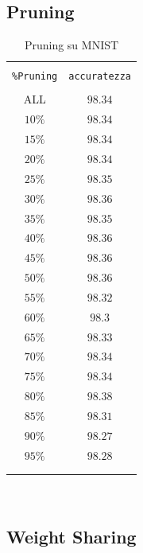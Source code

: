 \documentclass[11pt,a4paper,twoside,
openright]{book}
\begin{document}
\subsection{Pruning}

\vspace*{\fill}
\begin{center}

\begin{table}[]
  \small
  \caption{Pruning su MNIST}\label{tab:tabws}
\begin{center}
\begin{tabular}{cc}

\hline\\[-11pt]

\hline\\[-11pt]
\texttt{\%Pruning} & \texttt{accuratezza} \\[1pt]
\hline\\[-6.5pt]
ALL & $98.34$ \\ 
$10\%$ & $98.34$ \\ 
$15\%$ & $98.34$ \\ 
$20\%$ & $98.34$ \\ 
$25\%$ & $98.35$ \\ 
$30\%$ & $98.36$ \\ 
$35\%$ & $98.35$ \\ 
$40\%$ & $98.36$ \\ 
$45\%$ & $98.36$ \\ 
$50\%$ & $98.36$ \\ 
$55\%$ & $98.32$ \\ 
$60\%$ & $98.3$ \\ 
$65\%$ & $98.33$ \\ 
$70\%$ & $98.34$ \\ 
$75\%$ & $98.34$ \\ 
$80\%$ & $98.38$ \\ 
$85\%$ & $98.31$ \\ 
$90\%$ & $98.27$ \\ 
$95\%$ & $98.28$ \\   
\hline\\[-11pt]
\hline\\[-8pt]
\end{tabular}\\[5pt]
\end{center}
\normalsize
\end{table}
\end{center}



\subsection{Weight Sharing}
\end{document}
